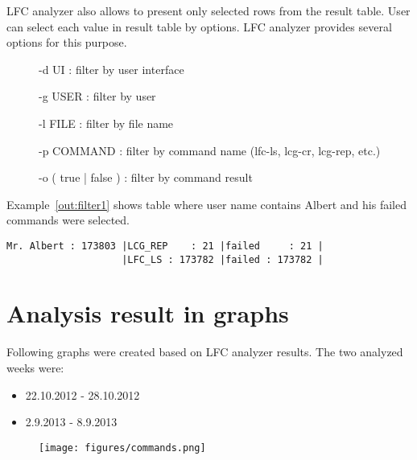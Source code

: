 \documentclass[a4paper, 11pt]{article} %
\begin{document}
LFC analyzer also allows to present only selected rows from the result table. User can select each value in result table by options. LFC analyzer provides several options for this purpose.

\begin{description}
    \item[] -d UI : filter by user interface
    \item[] -g USER : filter by user
    \item[] -l FILE : filter by file name
    \item[] -p COMMAND : filter by command name (lfc-ls, lcg-cr, lcg-rep, etc.)
    \item[] -o ( true | false ) : filter by command result
\end{description}

Example~\ref{out:filter1} shows table where user name contains Albert and his failed commands were selected.

\begin{center}
\begin{lstlisting}[style=cli, label={out:filter1}, caption={lfc\_analyzer -i log-20121201 -ucr -g Albert -o false}]
Mr. Albert : 173803 |LCG_REP    : 21 |failed     : 21 |
                    |LFC_LS : 173782 |failed : 173782 |
\end{lstlisting}
\end{center}


\section*{Analysis result in graphs}

Following graphs were created based on LFC analyzer results. The two analyzed weeks were:

\begin{itemize}
	\item 22.10.2012 - 28.10.2012
	\item 2.9.2013 - 8.9.2013
\end{itemize} 

\begin{figure}[H]
  \centering
    \texttt{[image: figures/commands.png]}
\end{figure}

\end{document}
